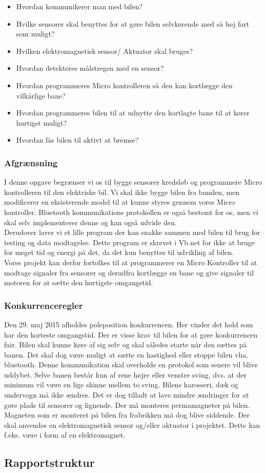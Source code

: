 \begin{itemize}
\item Hvordan kommunikerer man med bilen?
\item Hvilke sensorer skal benyttes for at gøre bilen selvkørende med så høj fart som muligt?
\item Hvilken elektromagnetisk sensor/ Aktuator skal bruges?
\item Hvordan detekteres målstregen med en sensor?
\item Hvordan programmeres Micro kontrolleren så den kan kortlægge den vilkårlige bane?
\item Hvordan programmeres bilen til at udnytte den kortlagte bane til at kører hurtigst muligt?
\item Hvordan fås bilen til aktivt at bremse?
\end{itemize}

\subsubsection{Afgrænsning}
I denne opgave begrænser vi os til bygge sensorer kredsløb og programmere Micro kontrolleren til den elektriske bil. Vi skal ikke bygge bilen fra bunden, men modificerer en eksisterende model til at kunne styres gennem vores Micro kontroller. Bluetooth kommunikations protokollen er også bestemt for os, men vi skal selv implementerer denne og kan også udvide den. \\

Derudover laver vi et lille program der kan snakke sammen med bilen til brug for testing og data modtagelse. Dette program er skrevet i Vb.net for ikke at bruge for meget tid og energi på det, da det kun benyttes til udvikling af bilen. \\

Vores projekt kan derfor fortolkes til at programmerer en Micro Kontroller til at modtage signaler fra sensorer og derudfra kortlægge en bane og give signaler til motoren for at sætte den hurtigste omgangstid. 


\subsubsection{Konkurrenceregler}
\label{kon_regler}
Den 29. maj 2015 afholdes poleposition konkurrencen. Her vinder det hold som har den korteste omgangstid. Der er visse krav til bilen for at gøre konkurrencen fair. Bilen skal kunne køre af sig selv og skal således starte når den sættes på banen. Det skal dog være muligt at sætte en hastighed eller stoppe bilen vha. bluetooth. Denne kommunikation skal overholde en protokol som senere vil blive uddybet. Selve banen består kun af rene højre eller venstre sving, dvs. at der minimum vil være en lige skinne mellem to sving. Bilens karosseri, dæk og undervogn må ikke ændres. Det er dog tilladt at lave mindre ændringer for at gøre plads til sensorer og lignende. Der må monteres permamagneter på bilen. Magneten som er monteret på bilen fra frabrikken må dog blive siddende. Der skal anvendes en elektromagnetisk sensor og/eller aktuator i projektet. Dette kan f.eks. være i form af en elektromagnet. 


\subsection{Rapportstruktur}